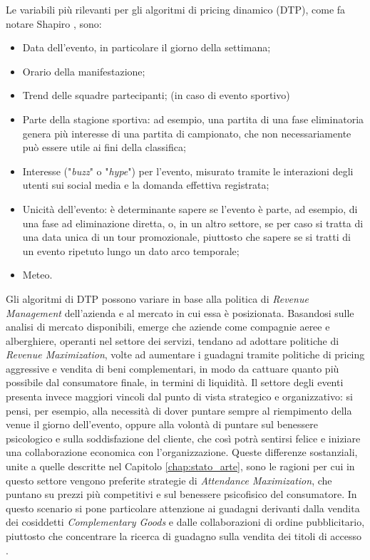 Le variabili più rilevanti per gli algoritmi di pricing dinamico (DTP), come fa notare Shapiro \cite{shapiro2014examination}, sono: 
\begin{itemize}
\item Data dell'evento, in particolare il giorno della settimana;
\item Orario della manifestazione;
\item Trend delle squadre partecipanti; (in caso di evento sportivo)
\item Parte della stagione sportiva: ad esempio, una partita di una fase eliminatoria genera più interesse di una partita di campionato, che non necessariamente può essere utile ai fini della classifica;
\item Interesse ("\textit{buzz}" o "\textit{hype}") per l'evento, misurato tramite le interazioni degli utenti sui social media \cite{o2018hashmoney} e la domanda effettiva registrata;
\item Unicità dell'evento: è determinante sapere se l'evento è parte, ad esempio, di una fase ad eliminazione diretta, o, in un altro settore, se per caso si tratta di una data unica di un tour promozionale, piuttosto che sapere se si tratti di un evento ripetuto lungo un dato arco temporale;
\item Meteo.
\end{itemize}
Gli algoritmi di DTP possono variare in base alla politica di \textit{Revenue Management} \cite{drayer2012dynamic} dell'azienda e al mercato in cui essa è posizionata. Basandosi sulle analisi di mercato disponibili, emerge che aziende come compagnie aeree e alberghiere, operanti nel settore dei servizi, tendano ad adottare politiche di \textit{Revenue Maximization}, volte ad aumentare i guadagni tramite politiche di pricing aggressive e vendita di beni complementari, in modo da cattuare quanto più possibile dal consumatore finale, in termini di liquidità. Il settore degli eventi presenta invece maggiori vincoli dal punto di vista strategico e organizzativo: si pensi, per esempio, alla necessità di dover puntare sempre al riempimento della venue il giorno dell'evento, oppure alla volontà di puntare sul benessere psicologico e sulla soddisfazione del cliente, che così potrà sentirsi felice e iniziare una collaborazione economica con l'organizzazione. Queste differenze sostanziali, unite a quelle descritte nel Capitolo \ref{chap:stato_arte}, sono le ragioni per cui in questo settore vengono preferite strategie di \textit{Attendance Maximization}, che puntano su prezzi più competitivi e sul benessere psicofisico del consumatore. In questo scenario si pone particolare attenzione ai guadagni derivanti dalla vendita dei cosiddetti \textit{Complementary Goods} e dalle collaborazioni di ordine pubblicitario, piuttosto che concentrare la ricerca di guadagno sulla vendita dei titoli di accesso \cite{drayer2012dynamic}.
